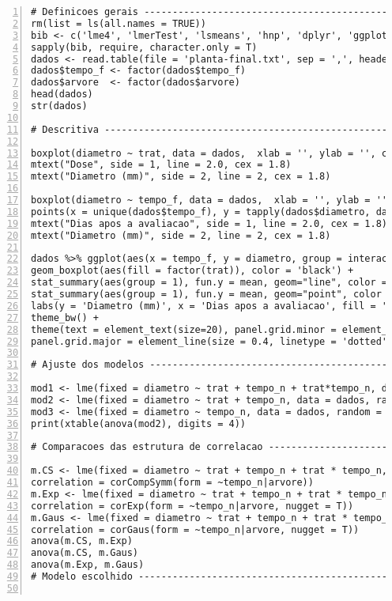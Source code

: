 \documentclass[12pt,a4paper,final]{article}
\begin{document}
\begin{lstlisting}[breaklines = true, frame = tblr, language = SAS, numbers=left, numberstyle=\tiny]
# Definicoes gerais -------------------------------------------------------
rm(list = ls(all.names = TRUE))
bib <- c('lme4', 'lmerTest', 'lsmeans', 'hnp', 'dplyr', 'ggplot2', 'RLRsim', 'nlme', 'xtable', 'influence.ME')
sapply(bib, require, character.only = T)
dados <- read.table(file = 'planta-final.txt', sep = ',', header = T)
dados$tempo_f <- factor(dados$tempo_f)
dados$arvore  <- factor(dados$arvore)
head(dados)
str(dados)

# Descritiva --------------------------------------------------------------

boxplot(diametro ~ trat, data = dados,  xlab = '', ylab = '', cex = 0.6, col = 'gray')
mtext("Dose", side = 1, line = 2.0, cex = 1.8)
mtext("Diametro (mm)", side = 2, line = 2, cex = 1.8)

boxplot(diametro ~ tempo_f, data = dados,  xlab = '', ylab = '', cex = 0.6, col = 'gray')
points(x = unique(dados$tempo_f), y = tapply(dados$diametro, dados$tempo_f, mean), pch = 16, col = 'red', cex = 0.8)
mtext("Dias apos a avaliacao", side = 1, line = 2.0, cex = 1.8)
mtext("Diametro (mm)", side = 2, line = 2, cex = 1.8)

dados %>% ggplot(aes(x = tempo_f, y = diametro, group = interaction(tempo_f, trat))) +
geom_boxplot(aes(fill = factor(trat)), color = 'black') +
stat_summary(aes(group = 1), fun.y = mean, geom="line", color = 'black') +
stat_summary(aes(group = 1), fun.y = mean, geom="point", color = 'gold') +
labs(y = 'Diametro (mm)', x = 'Dias apos a avaliacao', fill = 'Dose: ') +
theme_bw() +
theme(text = element_text(size=20), panel.grid.minor = element_blank(), legend.position="top",
panel.grid.major = element_line(size = 0.4, linetype = 'dotted', colour = 'gray'))

# Ajuste dos modelos ------------------------------------------------------

mod1 <- lme(fixed = diametro ~ trat + tempo_n + trat*tempo_n, data = dados, random = ~ 1 | arvore)
mod2 <- lme(fixed = diametro ~ trat + tempo_n, data = dados, random = ~ 1 | arvore)
mod3 <- lme(fixed = diametro ~ tempo_n, data = dados, random = ~ 1 | arvore)
print(xtable(anova(mod2), digits = 4))

# Comparacoes das estrutura de correlacao ---------------------------------

m.CS <- lme(fixed = diametro ~ trat + tempo_n + trat * tempo_n, data = dados, random = ~ 1 | arvore, 
correlation = corCompSymm(form = ~tempo_n|arvore))
m.Exp <- lme(fixed = diametro ~ trat + tempo_n + trat * tempo_n, data = dados, random = ~ 1 | arvore,
correlation = corExp(form = ~tempo_n|arvore, nugget = T))
m.Gaus <- lme(fixed = diametro ~ trat + tempo_n + trat * tempo_n, data = dados, random = ~ 1 | arvore,
correlation = corGaus(form = ~tempo_n|arvore, nugget = T))
anova(m.CS, m.Exp)
anova(m.CS, m.Gaus)
anova(m.Exp, m.Gaus)
# Modelo escolhido --------------------------------------------------------


\end{lstlisting}
\end{document}
